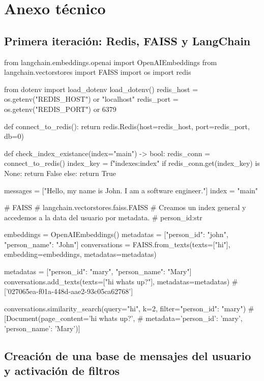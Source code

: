 \section{Anexo técnico}
\label{anexo:tecnico}

\subsection{Primera iteración: Redis, FAISS y LangChain}
\label{anexo:primera-iteracion-redis-faiss}

\begin{APACode}
from langchain.embeddings.openai import OpenAIEmbeddings
from langchain.vectorstores import FAISS
import os
import redis

from dotenv import load_dotenv
load_dotenv()
redis_host = os.getenv("REDIS_HOST") or "localhost"
redis_port = os.getenv("REDIS_PORT") or 6379

def connect_to_redis():
    return redis.Redis(host=redis_host, port=redis_port, db=0)

def check_index_existance(index="main") -> bool:
    redis_conn = connect_to_redis()
    index_key = f"indexes:{index}"
    if redis_conn.get(index_key) is None:
        return False
    else:
        return True

messages = ["Hello, my name is John. I am a software engineer."]
index = "main"

# FAISS
# langchain.vectorstores.faiss.FAISS
# Creamos un index general y accedemos a la data del usuario por metadata.
# {person_id:str}

embeddings = OpenAIEmbeddings()
metadatas = [{"person_id": "john", "person_name": "John"}]
conversations = FAISS.from_texts(texts=["hi"], embedding=embeddings, 
                                metadatas=metadatas)

metadatas = [{"person_id": "mary", "person_name": "Mary"}]
conversations.add_texts(texts=["hi whats up?"], metadatas=metadatas)
# ['027065ea-f01a-448d-aae2-93c05ca62768']

conversations.similarity_search(query="hi", k=2, filter={"person_id": "mary"})
# [Document(page_content='hi whats up?', 
#           metadata={'person_id': 'mary', 'person_name': 'Mary'})]
\end{APACode}

\subsection{Creación de una base de mensajes del usuario y activación de filtros}

